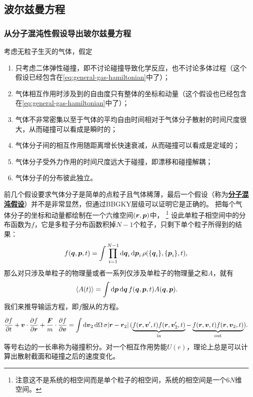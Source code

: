 \documentclass[hyperref, UTF8, a4paper]{ctexart}
\newcommand{\concept}[1]{\underline{\textbf{#1}}}
\begin{document}
\subsection{波尔兹曼方程}

\subsubsection{从分子混沌性假设导出玻尔兹曼方程}

考虑无粒子生灭的气体，假定
\begin{enumerate}
    \item 只考虑二体弹性碰撞，即不讨论碰撞导致化学反应，也不讨论多体过程（这个假设已经包含在\eqref{eq:general-gas-hamiltonian}中了）；
    \item 气体相互作用时涉及到的自由度只有整体的坐标和动量（这个假设也已经包含在\eqref{eq:general-gas-hamiltonian}中了）；
    \item 气体不非常密集以至于气体的平均自由时间相对于气体分子散射的时间尺度很大，从而碰撞可以看成是瞬时的；
    \item 气体分子间的相互作用随距离增长快速衰减，从而碰撞可以看成是定域的；
    \item 气体分子受外力作用的时间尺度远大于碰撞，即漂移和碰撞解耦；
    \item 气体分子的分布彼此独立。
\end{enumerate}
前几个假设要求气体分子是简单的点粒子且气体稀薄，最后一个假设（称为\concept{分子混沌假设}）并不是非常显然，但通过BBGKY层级可以证明它是正确的。
把每个气体分子的坐标和动量都绘制在一个六维空间$(\vb*{r}, \vb*{p})$中，%
\footnote{注意这不是系统的相空间而是单个粒子的相空间，系统的相空间是一个$6N$维空间。}%
设此单粒子相空间中的分布函数为$f$，它是多粒子分布函数积掉$N-1$个粒子，只剩下单个粒子所得到的结果：
\begin{equation}
    f(\vb*{q}, \vb*{p}, t) = \int \prod_{i=1}^{N-1} \dd{\vb*{q}_i} \dd{\vb*{p}_i} \rho(\{\vb*{q}_i\}, \{\vb*{p}_i\}, t),
\end{equation}
那么对只涉及单粒子的物理量或者一系列仅涉及单粒子的物理量之和$A$，就有
\begin{equation}
    \expval*{A(t)} = \int \dd{\vb*{p}} \dd{\vb*{q}} f(\vb*{q}, \vb*{p}, t) A(\vb*{q}, \vb*{p}).
\end{equation}
我们来推导输运方程，即$f$服从的方程。

\begin{equation}
    \pdv{f}{t} + \vb*{v} \cdot \pdv{f}{\vb*{r}} + \frac{\vb*{F}}{m} \cdot \pdv{f}{\vb*{v}} = \int \dd{\vb*{v}_2} \dd{\Omega} \sigma \abs*{\vb*{r}-\vb*{r}_2} (\underbrace{f(\vb*{r}, \vb*{v}', t) f(\vb*{r}, \vb*{v}'_{2}, t)}_\text{in} - \underbrace{f(\vb*{r}, \vb*{v}, t) f(\vb*{r}, \vb*{v}_{2}, t)}_\text{out}).
    \label{eq:boltzmann-eq}
\end{equation}
等号右边的一长串称为碰撞积分。对一个相互作用势能$U(r)$，理论上总是可以计算出散射截面和碰撞之后的速度变化。
\end{document}
